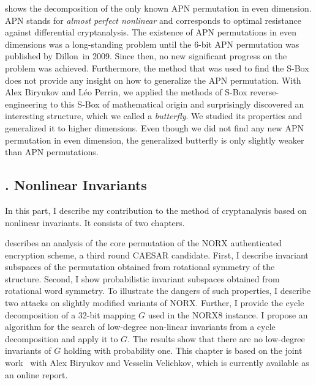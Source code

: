 \textbf{} shows the decomposition of the only known APN permutation in even dimension. APN stands for \emph{almost perfect nonlinear} and corresponds to optimal resistance against differential cryptanalysis. The existence of APN permutations in even dimensions was a long-standing problem until the 6-bit APN permutation was published by Dillon~\etal in 2009. Since then, no new significant progress on the problem was achieved. Furthermore, the method that was used to find the S-Box does not provide any insight on how to generalize the APN permutation. With Alex Biryukov and Léo Perrin, we applied the methods of S-Box reverse-engineering to this S-Box of mathematical origin and surprisingly discovered an interesting structure, which we called a \emph{butterfly}. We studied its properties and generalized it to higher dimensions. Even though we did not find any new APN permutation in even dimension, the generalized butterfly is only slightly weaker than APN permutations.


\subsection{. Nonlinear Invariants}

In this part, I describe my contribution to the method of cryptanalysis based on nonlinear invariants. It consists of two chapters.

\textbf{} describes an analysis of the core permutation of the NORX authenticated encryption scheme, a third round CAESAR candidate. First, I describe invariant subspaces of the permutation obtained from rotational symmetry of the structure. Second, I show probabilistic invariant subspaces obtained from rotational word symmetry. To illustrate the dangers of such properties, I describe two attacks on slightly modified variants of NORX. Further, I provide the cycle decomposition of a 32-bit mapping $G$ used in the NORX8 instance. I propose an algorithm for the search of low-degree non-linear invariants from a cycle decomposition and apply it to $G$. The results show that there are no low-degree invariants of $G$ holding with probability one. This chapter is based on the joint work~\cite{OurNORX} with Alex Biryukov and Vesselin Velichkov, which is currently available as an online report.

